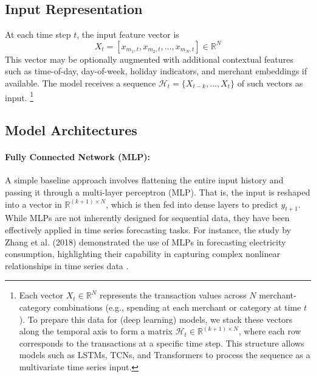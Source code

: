 \documentclass{article}
\begin{document}
\subsection{Input Representation}

At each time step \( t \), the input feature vector is
\[
X_t = [x_{m_1,t}, x_{m_2,t}, \dots, x_{m_N,t}] \in \mathbb{R}^N
\]
This vector may be optionally augmented with additional contextual features such as time-of-day, day-of-week, holiday indicators, and merchant embeddings if available. The model receives a sequence \( \mathcal{H}_t = \{X_{t-k}, \dots, X_t\} \) of such vectors as input. \footnote{Each vector \( X_t \in \mathbb{R}^N \) represents the transaction values across \( N \) merchant-category combinations (e.g., spending at each merchant or category at time \( t \)). To prepare this data for (deep learning) models, we stack these vectors along the temporal axis to form a matrix \( \mathcal{H}_t \in \mathbb{R}^{(k+1) \times N} \), where each row corresponds to the transactions at a specific time step. This structure allows models such as LSTMs, TCNs, and Transformers to process the sequence as a multivariate time series input.}

\subsection{Model Architectures}

\paragraph{Fully Connected Network (MLP):} A simple baseline approach involves flattening the entire input history and passing it through a multi-layer perceptron (MLP). That is, the input is reshaped into a vector in \( \mathbb{R}^{(k+1) \times N} \), which is then fed into dense layers to predict \( y_{t+1} \). While MLPs are not inherently designed for sequential data, they have been effectively applied in time series forecasting tasks. For instance, the study by Zhang et al. (2018) demonstrated the use of MLPs in forecasting electricity consumption, highlighting their capability in capturing complex nonlinear relationships in time series data \cite{zhang2018electricity}.
\end{document}
